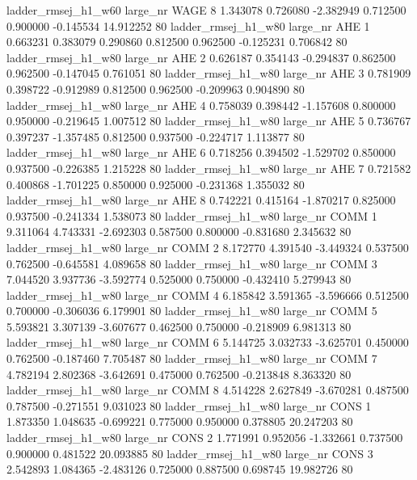 ladder_rmsej_h1_w60   large_nr     WAGE                 8  1.343078  0.726080  -2.382949 0.712500 0.900000 -0.145534   14.912252 80
ladder_rmsej_h1_w80   large_nr      AHE                 1  0.663231  0.383079   0.290860 0.812500 0.962500 -0.125231    0.706842 80
ladder_rmsej_h1_w80   large_nr      AHE                 2  0.626187  0.354143  -0.294837 0.862500 0.962500 -0.147045    0.761051 80
ladder_rmsej_h1_w80   large_nr      AHE                 3  0.781909  0.398722  -0.912989 0.812500 0.962500 -0.209963    0.904890 80
ladder_rmsej_h1_w80   large_nr      AHE                 4  0.758039  0.398442  -1.157608 0.800000 0.950000 -0.219645    1.007512 80
ladder_rmsej_h1_w80   large_nr      AHE                 5  0.736767  0.397237  -1.357485 0.812500 0.937500 -0.224717    1.113877 80
ladder_rmsej_h1_w80   large_nr      AHE                 6  0.718256  0.394502  -1.529702 0.850000 0.937500 -0.226385    1.215228 80
ladder_rmsej_h1_w80   large_nr      AHE                 7  0.721582  0.400868  -1.701225 0.850000 0.925000 -0.231368    1.355032 80
ladder_rmsej_h1_w80   large_nr      AHE                 8  0.742221  0.415164  -1.870217 0.825000 0.937500 -0.241334    1.538073 80
ladder_rmsej_h1_w80   large_nr     COMM                 1  9.311064  4.743331  -2.692303 0.587500 0.800000 -0.831680    2.345632 80
ladder_rmsej_h1_w80   large_nr     COMM                 2  8.172770  4.391540  -3.449324 0.537500 0.762500 -0.645581    4.089658 80
ladder_rmsej_h1_w80   large_nr     COMM                 3  7.044520  3.937736  -3.592774 0.525000 0.750000 -0.432410    5.279943 80
ladder_rmsej_h1_w80   large_nr     COMM                 4  6.185842  3.591365  -3.596666 0.512500 0.700000 -0.306036    6.179901 80
ladder_rmsej_h1_w80   large_nr     COMM                 5  5.593821  3.307139  -3.607677 0.462500 0.750000 -0.218909    6.981313 80
ladder_rmsej_h1_w80   large_nr     COMM                 6  5.144725  3.032733  -3.625701 0.450000 0.762500 -0.187460    7.705487 80
ladder_rmsej_h1_w80   large_nr     COMM                 7  4.782194  2.802368  -3.642691 0.475000 0.762500 -0.213848    8.363320 80
ladder_rmsej_h1_w80   large_nr     COMM                 8  4.514228  2.627849  -3.670281 0.487500 0.787500 -0.271551    9.031023 80
ladder_rmsej_h1_w80   large_nr     CONS                 1  1.873350  1.048635  -0.699221 0.775000 0.950000  0.378805   20.247203 80
ladder_rmsej_h1_w80   large_nr     CONS                 2  1.771991  0.952056  -1.332661 0.737500 0.900000  0.481522   20.093885 80
ladder_rmsej_h1_w80   large_nr     CONS                 3  2.542893  1.084365  -2.483126 0.725000 0.887500  0.698745   19.982726 80
